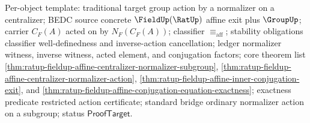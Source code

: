 Per-object template: traditional target group action by a normalizer on a
centralizer; BEDC source concrete $\FieldUp(\RatUp)$ affine exit plus
$\GroupUp$; carrier $C_F(A)$ acted on by $N_F(C_F(A))$; classifier
$\equiv_{\mathrm{aff}}$; stability obligations classifier well-definedness and
inverse-action cancellation; ledger normalizer witness, inverse witness, acted
element, and conjugation factors; core theorem list
\autoref{thm:ratup-fieldup-affine-centralizer-normalizer-subgroup},
\autoref{thm:ratup-fieldup-affine-centralizer-normalizer-action},
\autoref{thm:ratup-fieldup-affine-inner-conjugation-exit}, and
\autoref{thm:ratup-fieldup-affine-conjugation-equation-exactness}; exactness
predicate restricted action certificate; standard bridge ordinary normalizer
action on a subgroup; status $\mathsf{ProofTarget}$.

